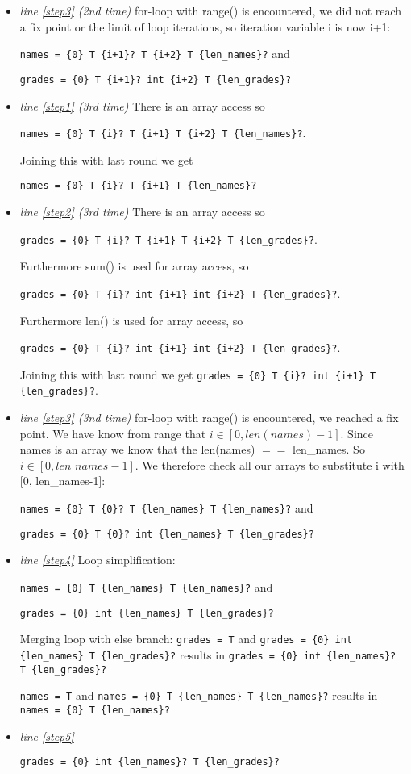 \documentclass[11pt]{article}
\begin{document}
\begin{itemize}
\item \textit{line \ref{step3} (2nd time)} for-loop with range() is encountered, we did not reach a fix point or the limit of loop iterations, so iteration variable i is now i+1: 

\verb|names = {0} T {i+1}? T {i+2} T {len_names}?| and 

\verb|grades = {0} T {i+1}? int {i+2} T {len_grades}?|

\item \textit{line \ref{step1} (3rd time)} There is an array access so 

\verb|names = {0} T {i}? T {i+1} T {i+2} T {len_names}?|. 

Joining this with last round we get 

\verb|names = {0} T {i}? T {i+1} T {len_names}?|

\item \textit{line \ref{step2} (3rd time)} There is an array access so 

\verb|grades = {0} T {i}? T {i+1} T {i+2} T {len_grades}?|. 

Furthermore sum() is used for array access, so 

\verb|grades = {0} T {i}? int {i+1} int {i+2} T {len_grades}?|. 

Furthermore len() is used for array access, so 

\verb|grades = {0} T {i}? int {i+1} int {i+2} T {len_grades}?|.  

Joining this with last round we get \verb|grades = {0} T {i}? int {i+1} T {len_grades}?|.

\item \textit{line \ref{step3} (3nd time)} for-loop with range() is encountered, we reached a fix point. We have know from range that $i \in [0, len(names)-1]$. Since names is an array we know that the len(names) $==$ len\_names. So $i \in [0, len\_names-1]$. We therefore check all our arrays to substitute i with [0, len\_names-1]: 

\verb|names = {0} T {0}? T {len_names} T {len_names}?| and 

\verb|grades = {0} T {0}? int {len_names} T {len_grades}?|

\item \textit{line \ref{step4}} Loop simplification:

\verb|names = {0} T {len_names} T {len_names}?| and 

\verb|grades = {0} int {len_names} T {len_grades}?|

Merging loop with else branch:
\verb|grades = T| and \verb|grades = {0} int {len_names} T {len_grades}?| results in \verb|grades = {0} int {len_names}? T {len_grades}?|

\verb|names = T| and \verb|names = {0} T {len_names} T {len_names}?| results in \verb|names = {0} T {len_names}?|

\item \textit{line \ref{step5}} 

\verb|grades = {0} int {len_names}? T {len_grades}?|

\end{itemize}
\end{document}
